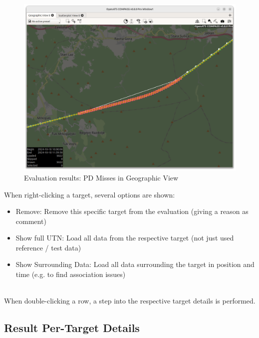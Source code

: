\begin{figure}[H]
  \hspace*{-2.5cm}
    \includegraphics[width=19cm]{figures/eval_results_single_geoview.png}
  \caption{Evaluation results: PD Misses in Geographic View}
\end{figure}

When right-clicking a target, several options are shown:
\begin{itemize}  
\item Remove: Remove this specific target from the evaluation (giving a reason as comment)
\item Show full UTN: Load all data from the respective target (not just used reference / test data)
\item Show Surrounding Data: Load all data surrounding the target in position and time (e.g. to find association issues)
\end{itemize}  
\ \\

When double-clicking a row, a step into the respective target details is performed.

\subsection{Result Per-Target Details}

